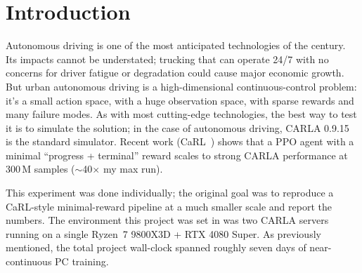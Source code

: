 \documentclass[conference]{IEEEtran}
\begin{document}
\begin{abstract}
crash into them in case they are driving incorrectly. This was
only discovered post-hoc, after the sixth and final failure.
The only one to succeed was a frozen BC policy, which was
evaluated over 20 episodes after the frozen NPC bug was dealt
with. It got a 7.42\% mean route completion, 32.93\% max route
completion, 75\% collision rate, 25\% off-route, and an average
speed of 5.37\,m/s. The 75\% collision rate is consistent with
the general distribution-shift failure mode documented by
Codevilla et al.~\cite{codevilla} (their paper supports the
mechanism, not this specific number); the residual
training-time plateau that
was faced is attributed to the compute-scarcity ceiling and the
reward pathologies, not just the NPC bug. The contributions of
this work are a failure catalogue with pre-defined diagnostic
criteria, alongside the methodology lesson that a single
environment setup can silently infect days of compute in ways
no PPO metric can reveal on the surface.
\end{abstract}

\section{Introduction}

Autonomous driving is one of the most anticipated technologies
of the century. Its impacts cannot be understated; trucking
that can operate 24/7 with no concerns for driver fatigue or
degradation could cause major economic growth. But urban
autonomous driving is a high-dimensional continuous-control
problem: it's a small action space, with a huge observation
space, with sparse rewards and many failure modes. As with
most cutting-edge technologies, the best way to test it is to
simulate the solution; in the case of autonomous driving,
CARLA 0.9.15~\cite{carla} is the standard simulator. Recent
work (CaRL~\cite{carl}) shows that a PPO agent with a minimal
``progress + terminal'' reward scales to strong CARLA
performance at 300\,M samples ($\sim$40$\times$ my max run).

This experiment was done individually; the original goal was
to reproduce a CaRL-style minimal-reward pipeline at a much
smaller scale and report the numbers. The environment this
project was set in was two CARLA servers running on a single
Ryzen~7 9800X3D + RTX 4080 Super. As previously mentioned,
the total project wall-clock spanned roughly seven days of
near-continuous PC training.
\end{document}
